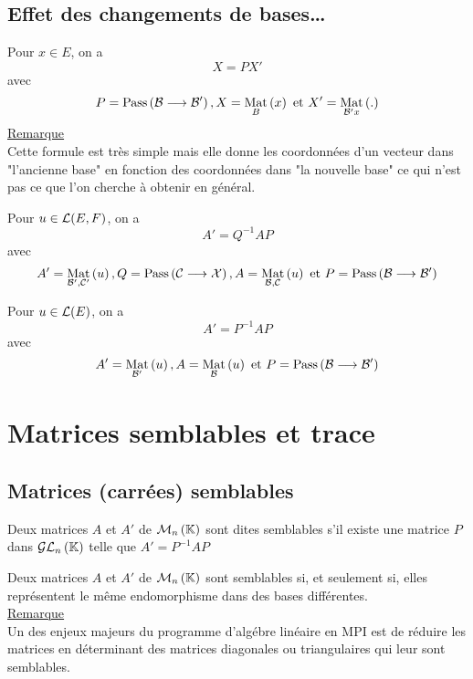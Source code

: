 \subsection{Effet des changements de bases\dots}
\begin{defprop}
    Pour \(x \in E\), on a
    \[X = P X'\]
    avec
    \[  P = \pass{\cal{B}}{\cal{B'}}, X = \Mat{B}{x}\text{ et } X' = \Mat{\cal{B'}{x}}.\]
    \underline{Remarque} \\
    Cette formule est très simple mais elle donne les coordonnées d’un vecteur dans "l’ancienne base" en fonction des coordonnées dans "la nouvelle base" ce qui n’est pas ce que l’on cherche à obtenir en général.
\end{defprop}

\begin{defprop}
    Pour \(u \in \cal{L}(E, F )\), on a
    \[A' = Q^{-1}AP\]
    avec
\[A' = \Mat{\cal{B'}, \cal{C'}}{u}, Q = \pass{\cal{C}}{\cal{X}}, A = \Mat{\cal{B}, \cal{C}}{u} \text{ et }P = \pass{\cal{B}}{\cal{B'}}\]
\end{defprop}

\begin{defprop}
    Pour \(u \in \cal{L}(E)\), on a
    \[A' = P ^{-1}AP\]
    avec
\[A' = \Mat{\cal{B'}}{u}, A = \Mat{\cal{B}}{u} \text{ et }P = \pass{\cal{B}}{\cal{B'}}\]
\end{defprop}

\section{Matrices semblables et trace}
\subsection{Matrices (carrées) semblables}
    \begin{defi}
        Deux matrices \(A\) et \(A'\) de \(\M{n}\) sont dites semblables s’il existe une matrice \(P\) dans \(\GL{n}\) telle que \(A' = P ^{-1}AP\) 
    \end{defi}
\begin{defprop}
    Deux matrices \(A\) et \(A'\) de \(\M{n}\) sont semblables si, et seulement si, elles représentent le même endomorphisme dans des bases différentes.\\
    \underline{Remarque} \\
    Un des enjeux majeurs du programme d’algébre linéaire en MPI est de réduire les matrices en déterminant des matrices diagonales ou triangulaires qui leur sont semblables.
\end{defprop}

